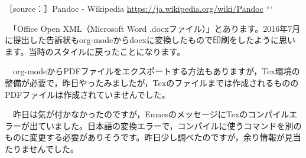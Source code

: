 \documentclass[]{ltjarticle}
\begin{document}
［source：］Pandoc - Wikipedia \url{https://ja.wikipedia.org/wiki/Pandoc}
```

　「Office Open XML（Microsoft Word .docxファイル）」とあります。2016年7月に提出した告訴状もorg-modeからdocxに変換したもので印刷をしたように思います。当時のスタイルに戻ったことになります。

　org-modeからPDFファイルをエクスポートする方法もありますが，Tex環境の整備が必要で，昨日やったみましたが，Texのファイルまでは作成されるもののPDFファイルは作成されていませんでした。

　昨日は気が付かなかったのですが，EmacsのメッセージにTexのコンパイルエラーが出ていました。日本語の変換エラーで，コンパイルに使うコマンドを別のものに変更する必要がありそうです。昨日少し調べたのですが，余り情報が見当たりませんでした。
\end{document}
